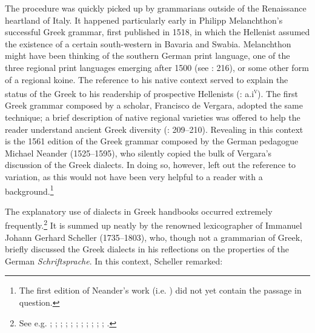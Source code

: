 The procedure was quickly picked up by grammarians outside of the Renaissance heartland of Italy. It happened particularly early in Philipp Melanchthon’s successful Greek grammar, first published in 1518, in which the  Hellenist assumed the existence of a certain south-western   in Bavaria and Swabia. Melanchthon might have been thinking of the southern German print language, one of the three regional print languages emerging after 1500 (see \citealt{Mattheier2003}: 216), or some other form of a regional koine. The reference to his native  context served to explain the status of the Greek  to his readership of prospective Hellenists (\citealt{Melanchthon1518}: a.i\textsc{\textsuperscript{v}}). The first Greek grammar composed by a  scholar, Francisco de Vergara, adopted the same technique; a brief description of native regional varieties was offered to help the  reader understand ancient Greek diversity (\citealt{Vergara1537}: 209–210). Revealing in this context is the 1561 edition of the Greek grammar composed by the German pedagogue Michael Neander (1525–1595), who silently copied the bulk of Vergara’s discussion of the Greek dialects. In doing so, however, \citet[340--343]{Neander1561} left out the reference to  variation, as this would not have been very helpful to a reader with a  background.\footnote{The first edition of Neander’s work (i.e. \citealt{Neander1553}) did not yet contain the passage in question.}

The explanatory use of  dialects in Greek handbooks occurred extremely frequently.\footnote{See e.g. \citet[3--4]{Schmidt1604}; \citet[83]{Rhenius1626}; \citet[\textsc{b.4}\textsc{\textsuperscript{r}}]{Schorling1678}; \citet[\textsc{b.2}\textsc{\textsuperscript{v}}]{KirchmaierCrusius1684}; \citet[376]{Kober1701}; \citet[\textsc{c.2}\textsc{\textsuperscript{v}}]{Thryllitsch1709}; \citet[b.2\textsc{\textsuperscript{v}}\textsc{–}b.3\textsc{\textsuperscript{r}}]{Nibbe1725}; \citet[141]{Georgi1733}; \citet[13]{Schuster1737}; \citet[207--209]{Simonis1752}; \citet[191--192]{Peternader1776}; \citet[\textsc{xxvi}]{Harles1778}.} It is summed up neatly by the renowned  lexicographer of  Immanuel Johann Gerhard Scheller (1735–1803), who, though not a grammarian of Greek, briefly discussed the Greek dialects in his reflections on the properties of the German \textit{Schriftsprache}. In this context, Scheller remarked:

